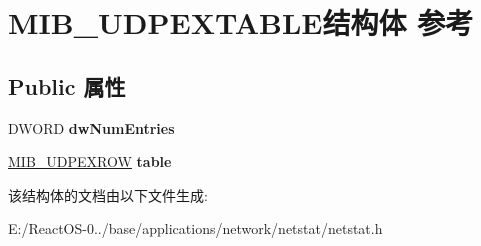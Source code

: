 \hypertarget{struct_m_i_b___u_d_p_e_x_t_a_b_l_e}{}\section{M\+I\+B\+\_\+\+U\+D\+P\+E\+X\+T\+A\+B\+L\+E结构体 参考}
\label{struct_m_i_b___u_d_p_e_x_t_a_b_l_e}
\subsection*{Public 属性}
\begin{DoxyCompactItemize}
\item 
\mbox{\label{struct_m_i_b___u_d_p_e_x_t_a_b_l_e_acd471804abfc78190404ab499ce6b6bd}} 
D\+W\+O\+RD {\bfseries dw\+Num\+Entries}
\item 
\mbox{\label{struct_m_i_b___u_d_p_e_x_t_a_b_l_e_ac0827dc13b60e03da7dc83e7d3ac5e60}} 
\hyperlink{struct_m_i_b___u_d_p_e_x_r_o_w}{M\+I\+B\+\_\+\+U\+D\+P\+E\+X\+R\+OW} {\bfseries table}
\end{DoxyCompactItemize}


该结构体的文档由以下文件生成\+:\begin{DoxyCompactItemize}
\item 
E\+:/\+React\+O\+S-\/0../base/applications/network/netstat/netstat.\+h\end{DoxyCompactItemize}
